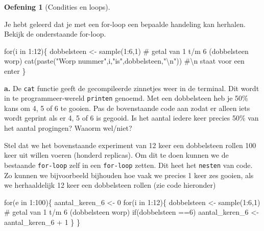 \documentclass[
  a4paper,
]{scrbook}
\newenvironment{Shaded}{\begin{snugshade}}{\end{snugshade}}
\newcommand{\CommentTok}[1]{\textcolor[rgb]{0.37,0.37,0.37}{#1}}
\newcommand{\ControlFlowTok}[1]{\textcolor[rgb]{0.00,0.23,0.31}{#1}}
\newcommand{\DecValTok}[1]{\textcolor[rgb]{0.68,0.00,0.00}{#1}}
\newcommand{\FunctionTok}[1]{\textcolor[rgb]{0.28,0.35,0.67}{#1}}
\newcommand{\NormalTok}[1]{\textcolor[rgb]{0.00,0.23,0.31}{#1}}
\newcommand{\OtherTok}[1]{\textcolor[rgb]{0.00,0.23,0.31}{#1}}
\newcommand{\SpecialCharTok}[1]{\textcolor[rgb]{0.37,0.37,0.37}{#1}}
\newcommand{\StringTok}[1]{\textcolor[rgb]{0.13,0.47,0.30}{#1}}
\theoremstyle{definition}
\newtheorem{exercise}{Oefening}[chapter]
\theoremstyle{remark}
\begin{document}
\begin{exercise}[Condities en
loops]\protect\hypertarget{exr-R-4}{}\label{exr-R-4}

Je hebt geleerd dat je met een for-loop een bepaalde handeling kan
herhalen. Bekijk de onderstaande for-loop.

\begin{Shaded}
\begin{Highlighting}[]
\ControlFlowTok{for}\NormalTok{(i }\ControlFlowTok{in} \DecValTok{1}\SpecialCharTok{:}\DecValTok{12}\NormalTok{)\{}
\NormalTok{  dobbelsteen }\OtherTok{\textless{}{-}} \FunctionTok{sample}\NormalTok{(}\DecValTok{1}\SpecialCharTok{:}\DecValTok{6}\NormalTok{,}\DecValTok{1}\NormalTok{) }\CommentTok{\# getal van 1 t/m 6 (dobbelsteen worp)}
  \FunctionTok{cat}\NormalTok{(}\FunctionTok{paste}\NormalTok{(}\StringTok{"Worp nummer"}\NormalTok{,i,}\StringTok{"is"}\NormalTok{,dobbelsteen,}\StringTok{"}\SpecialCharTok{\textbackslash{}n}\StringTok{"}\NormalTok{)) }\CommentTok{\#\textbackslash{}n staat voor een \textquotesingle{}enter\textquotesingle{}}
\NormalTok{\}}
\end{Highlighting}
\end{Shaded}

\textbf{a.} De \texttt{cat} functie geeft de gecompileerde zinnetjes
weer in de terminal. Dit wordt in te programmeer-wereld \texttt{printen}
genoemd. Met een dobbelsteen heb je 50\% kans om 4, 5 of 6 te gooien.
Pas de bovenstaande code aan zodat er alleen iets wordt geprint als er
4, 5 of 6 is gegooid. Is het aantal iedere keer precies 50\% van het
aantal progingen? Waaorm wel/niet?

Stel dat we het bovenstaande experiment van 12 keer een dobbelsteen
rollen 100 keer uit willen voeren (honderd replicas). Om dit te doen
kunnen we de bestaande \texttt{for-loop} zelf in een \texttt{for-loop}
zetten. Dit heet het \texttt{nesten} van code. Zo kunnen we bijvoorbeeld
bijhouden hoe vaak we precies 1 keer zes gooien, als we herhaaldelijk 12
keer een dobbelsteen rollen (zie code hieronder)

\begin{Shaded}
\begin{Highlighting}[]
\ControlFlowTok{for}\NormalTok{(e }\ControlFlowTok{in} \DecValTok{1}\SpecialCharTok{:}\DecValTok{100}\NormalTok{)\{}
\NormalTok{  aantal\_keren\_6 }\OtherTok{\textless{}{-}} \DecValTok{0}
  \ControlFlowTok{for}\NormalTok{(i }\ControlFlowTok{in} \DecValTok{1}\SpecialCharTok{:}\DecValTok{12}\NormalTok{)\{}
\NormalTok{    dobbelsteen }\OtherTok{\textless{}{-}} \FunctionTok{sample}\NormalTok{(}\DecValTok{1}\SpecialCharTok{:}\DecValTok{6}\NormalTok{,}\DecValTok{1}\NormalTok{) }\CommentTok{\# getal van 1 t/m 6 (dobbelsteen worp)}
    \ControlFlowTok{if}\NormalTok{(dobbelsteen }\SpecialCharTok{==}\DecValTok{6}\NormalTok{) aantal\_keren\_6 }\OtherTok{\textless{}{-}}\NormalTok{ aantal\_keren\_6 }\SpecialCharTok{+} \DecValTok{1}
\NormalTok{  \}}
\NormalTok{\}}
\end{Highlighting}
\end{Shaded}


\end{exercise}
\end{document}
